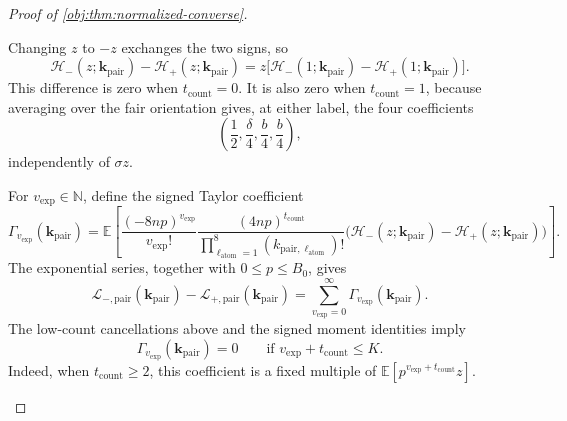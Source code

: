 \begin{proof}[Proof of \cref{obj:thm:normalized-converse}]
\begin{enumerate}
Changing \(z\) to \(-z\) exchanges the two signs, so
\[
\mathcal H_-(z;\boldsymbol{k}_{\mathrm{pair}})
-\mathcal H_+(z;\boldsymbol{k}_{\mathrm{pair}})
=
z\bigl[
\mathcal H_-(1;\boldsymbol{k}_{\mathrm{pair}})
-\mathcal H_+(1;\boldsymbol{k}_{\mathrm{pair}})
\bigr].
\]
This difference is zero when \(t_{\mathrm{count}}=0\). It is also zero when
\(t_{\mathrm{count}}=1\), because averaging over the fair orientation gives, at either label, the four coefficients
\[
\left(\frac12,\frac\delta4,\frac b4,\frac b4\right),
\]
independently of \(\sigma z\).

For \(v_{\mathrm{exp}}\in\mathbb N\), define the signed Taylor coefficient
\[
\Gamma_{v_{\mathrm{exp}}}
(\boldsymbol{k}_{\mathrm{pair}})
=
\mathbb E\!\left[
\frac{(-8np)^{v_{\mathrm{exp}}}}{v_{\mathrm{exp}}!}
\frac{(4np)^{t_{\mathrm{count}}}}
     {\prod_{\ell_{\mathrm{atom}}=1}^{8}
       (k_{\mathrm{pair},\ell_{\mathrm{atom}}})!}
\bigl(\mathcal H_-(z;\boldsymbol{k}_{\mathrm{pair}})
-\mathcal H_+(z;\boldsymbol{k}_{\mathrm{pair}})\bigr)
\right].
\]
The exponential series, together with \(0\le p\le B_0\), gives
\[
\mathcal L_{-,\mathrm{pair}}(\boldsymbol{k}_{\mathrm{pair}})
-\mathcal L_{+,\mathrm{pair}}(\boldsymbol{k}_{\mathrm{pair}})
=
\sum_{v_{\mathrm{exp}}=0}^{\infty}
\Gamma_{v_{\mathrm{exp}}}(\boldsymbol{k}_{\mathrm{pair}}).
\]
The low-count cancellations above and the signed moment identities imply
\[
\Gamma_{v_{\mathrm{exp}}}(\boldsymbol{k}_{\mathrm{pair}})=0
\qquad
\text{if }v_{\mathrm{exp}}+t_{\mathrm{count}}\le K.
\]
Indeed, when \(t_{\mathrm{count}}\ge2\), this coefficient is a fixed multiple of
\(\mathbb E[p^{v_{\mathrm{exp}}+t_{\mathrm{count}}}z]\).


\end{enumerate}
\end{proof}
